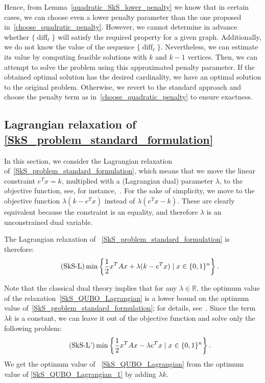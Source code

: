 \documentclass{article}
\DeclareMathOperator{\diff}{diff}
\begin{document}
Hence, from Lemma~\ref{quadratic_SkS_lower_penalty} we know that in certain cases, we can choose even a lower penalty parameter than the one proposed in~\eqref{choose_quadratic_penalty}. However, we cannot determine in advance whether $\{\diff_\ell\}$ will satisfy the required property for a given graph. Additionally, we do not know the value of the sequence $\{\diff_\ell\}$. Nevertheless, we can estimate its value by computing feasible solutions with $k$ and $k-1$ vertices. Then, we can attempt to solve the problem using this approximated penalty parameter. If the obtained optimal solution has the desired cardinality, we have an optimal solution to the original problem. Otherwise, we revert to the standard approach and choose the penalty term as in~\eqref{choose_quadratic_penalty} to ensure exactness.


\subsection{Lagrangian  relaxation of \ref{SkS_problem_standard_formulation}}
\label{section_LR_SkS}

In this section, we consider the Lagrangian relaxation of~\eqref{SkS_problem_standard_formulation}, which means that we move the linear constraint $e^Tx=k$, multiplied with a (Lagrangian dual) parameter $\lambda$, to the objective function, see, for instance,~\cite{Ahuja1993}.
For the sake of simplicity, we move to the objective function $\lambda(k-e^Tx)$ instead of 
$\lambda(e^Tx-k)$. These are clearly equivalent because the constraint is an equality, and therefore $\lambda$ is an unconstrained dual variable.

The Lagrangian relaxation of ~\eqref{SkS_problem_standard_formulation} is therefore: 
\begin{align}\label{SkS_QUBO_Lagrangian}
\tag{\mbox{SkS-L}}
     \min \left\{\frac{1}{2}x^TAx + \lambda(k-e^Tx) \mid x \in \{0, 1\}^n \right\}.
\end{align}

Note that the classical dual theory implies that for any $\lambda \in \mathbb{R}$, the optimum value of the relaxation~\eqref{SkS_QUBO_Lagrangian} is a lower bound on the optimum value of~\eqref{SkS_problem_standard_formulation}; for details, see~\cite{Ahuja1993}.
Since the term $\lambda k$ is a constant, we can leave it out of the objective function and solve only the following problem:
\begin{align} 
\tag{\mbox{SkS-L'}}
  \min \left\{\frac{1}{2}x^TAx - \lambda e^Tx \mid x \in \{0, 1\}^n \right\}.
  \label{SkS_QUBO_Lagrangian_1} 
\end{align} 
We get the optimum value of ~\eqref{SkS_QUBO_Lagrangian} from the optimum value of 
\eqref{SkS_QUBO_Lagrangian_1} by adding $\lambda k$. 
\end{document}
